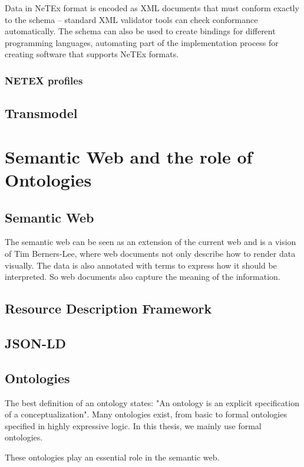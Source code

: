 Data in NeTEx format is encoded as XML documents that must conform exactly to the schema – standard XML validator tools can check conformance automatically. The schema can also be used to create bindings for different
programming languages, automating part of the implementation process for creating software that supports NeTEx
formats. 
\subsubsection{NETEX profiles}
\subsection{Transmodel}
\section{Semantic Web and the role of Ontologies}\label{section:ontologies_rel_work}
\subsection{Semantic Web}
The semantic web can be seen as an extension of the current web and is a vision of Tim Berners-Lee, where web documents not only describe how to render data visually. The data is also annotated with terms to express how it should be interpreted. So web documents also capture the meaning of the information.
\subsection{Resource Description Framework}
\subsection{JSON-LD}

\subsection{Ontologies}
The best definition of an ontology states: "An ontology is an explicit specification of a conceptualization"\cite{gruber_translation_1993}. Many ontologies exist, from basic to formal ontologies specified in highly expressive logic. In this thesis, we mainly use formal ontologies.

These ontologies play an essential role in the semantic web. 


